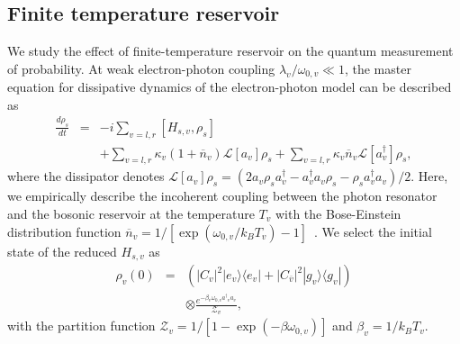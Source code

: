 \documentclass[twocolumn,showpacs,preprintnumbers,amsmath,amssymb]{revtex4}
\begin{document}
	
	\subsection{Finite temperature reservoir}
	We study the effect of finite-temperature reservoir on the quantum measurement of probability.
	At weak electron-photon coupling $\lambda_v/\omega_{0,v}{\ll}1$,
	the master equation for dissipative dynamics of the electron-photon model can be described as
	\begin{eqnarray}
		\frac{d\rho_s}{dt}&=&-i\sum_{v={l},{r}}[H_{s,v},\rho_s]\\
		&&+\sum_{v={l},{r}}\kappa_v(1+\overline{n}_v)\mathcal{L}[a_v]\rho_s
		+\sum_{v={l},{r}}\kappa_v\overline{n}_v\mathcal{L}[a^\dag_v]\rho_s,\nonumber
	\end{eqnarray}
	where the dissipator denotes
	$\mathcal{L}[a_v]\rho_s=(
	2a_v\rho_sa^\dag_v-a^\dag_va_v\rho_s-\rho_sa^\dag_va_v)/2$.
	Here, we empirically describe the incoherent coupling between the photon resonator
	and the bosonic reservoir at the temperature $T_v$ with  the Bose-Einstein distribution function $\overline{n}_v=1/[\exp(\omega_{0,v}/k_BT_v)-1]$~\cite{jmfink2010prl,tbosen2023prl}.
	We select the initial state of the reduced $H_{s,v}$ as
	\begin{eqnarray}
		\rho_v(0)&=&(|C_v|^2|e_{v}{\rangle}{\langle}e_{v}|+|C_{\overline{v}}|^2|g_{v}{\rangle}{\langle}g_{v}|)\\
		&&{\otimes}
		\frac{e^{-\beta_v\omega_{0,v}{a^\dag}_va_v}}{\mathcal{Z}_v},\nonumber
	\end{eqnarray}
	with the partition function
	$\mathcal{Z}_v=1/[1-\exp(-\beta\omega_{0,v})]$
	and $\beta_v=1/k_BT_v$.
	
	
	
\end{document}
